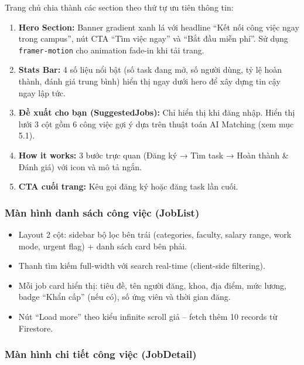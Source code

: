 Trang chủ chia thành các section theo thứ tự ưu tiên thông tin:

\begin{enumerate}
  \item \textbf{Hero Section:} Banner gradient xanh lá với headline ``Kết nối công việc ngay
    trong campus'', nút CTA ``Tìm việc ngay'' và ``Bắt đầu miễn phí''. Sử dụng
    \texttt{framer-motion} cho animation fade-in khi tải trang.

  \item \textbf{Stats Bar:} 4 số liệu nổi bật (số task đang mở, số người dùng, tỷ lệ hoàn
    thành, đánh giá trung bình) hiển thị ngay dưới hero để xây dựng tin cậy ngay lập tức.

  \item \textbf{Đề xuất cho bạn (SuggestedJobs):} Chỉ hiển thị khi đăng nhập. Hiển thị
    lưới 3 cột gồm 6 công việc gợi ý dựa trên thuật toán AI Matching (xem mục 5.1).

  \item \textbf{How it works:} 3 bước trực quan (Đăng ký → Tìm task → Hoàn thành \&
    Đánh giá) với icon và mô tả ngắn.

  \item \textbf{CTA cuối trang:} Kêu gọi đăng ký hoặc đăng task lần cuối.
\end{enumerate}

\subsubsection{Màn hình danh sách công việc (JobList)}

\begin{itemize}
  \item Layout 2 cột: sidebar bộ lọc bên trái (categories, faculty, salary range, work mode,
    urgent flag) + danh sách card bên phải.
  \item Thanh tìm kiếm full-width với search real-time (client-side filtering).
  \item Mỗi job card hiển thị: tiêu đề, tên người đăng, khoa, địa điểm, mức lương,
    badge ``Khẩn cấp'' (nếu có), số ứng viên và thời gian đăng.
  \item Nút ``Load more'' theo kiểu infinite scroll giả -- fetch thêm 10 records từ Firestore.
\end{itemize}

\subsubsection{Màn hình chi tiết công việc (JobDetail)}

